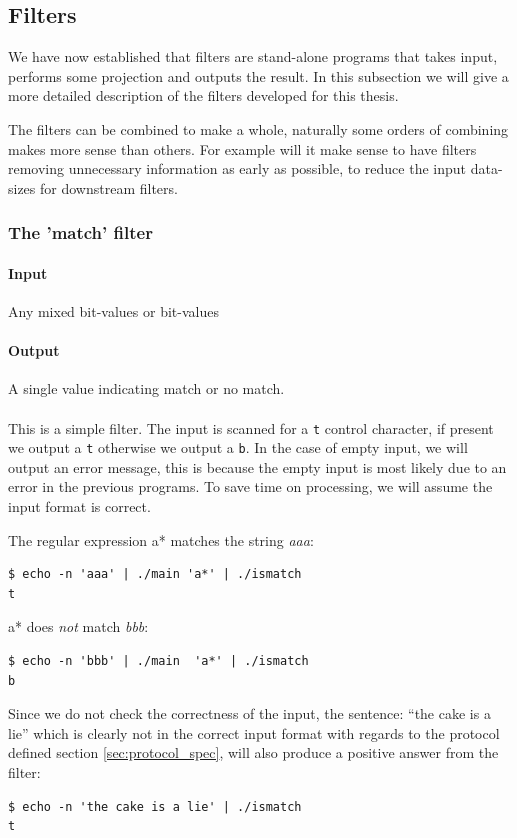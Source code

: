 \subsection{Filters}

We have now established that filters are stand-alone programs that
takes input, performs some projection and outputs the result. In this
subsection we will give a more detailed description of the filters
developed for this thesis. 

The filters can be combined to make a whole, naturally some orders of
combining makes more sense than others. For example will it make sense
to have filters removing unnecessary information as early as possible,
to reduce the input data-sizes for downstream filters.




\subsubsection{The 'match' filter}

\paragraph{Input} Any mixed bit-values or bit-values
\paragraph{Output} A single value indicating match or no match.
\paragraph{}

This is a simple filter. The input is scanned for a \texttt{t} control
character, if present we output a \texttt{t} otherwise we output a
\texttt{b}. In the case of empty input, we will output an error
message, this is because the empty input is most likely due to an
error in the previous programs. To save time on processing, we will
assume the input format is correct.

\begin{example}
The regular expression \textsf{a*} matches the string \textsl{aaa}:
\begin{verbatim}
$ echo -n 'aaa' | ./main 'a*' | ./ismatch 
t
\end{verbatim}
\textsf{a*} does \emph{not} match \textsl{bbb}:
\begin{verbatim}
$ echo -n 'bbb' | ./main  'a*' | ./ismatch 
b
\end{verbatim}
Since we do not check the correctness of the input, the sentence:
``the cake is a lie'' which is clearly not in the correct input format
with regards to the protocol defined section \vref{sec:protocol_spec},
will also produce a positive answer from the filter:
\begin{verbatim}
$ echo -n 'the cake is a lie' | ./ismatch
t
\end{verbatim}

\end{example}

